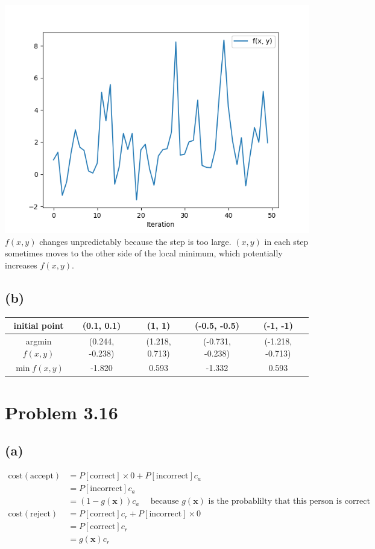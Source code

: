 \documentclass{article}
\begin{document}
		\includegraphics[scale=0.7]{2a2.png}\\
		$f(x, y)$ changes unpredictably because the step is too large. $(x, y)$ in each step sometimes moves to the other side of the local minimum, which potentially increases $f(x, y)$.
		
	\subsection*{(b)}
		\begin{tabular}{c|cccc}
			initial point & (0.1, 0.1) & (1, 1) & (-0.5, -0.5) & (-1, -1)\\
			\hline
			argmin $f(x, y)$ & (0.244, -0.238) & (1.218, 0.713) & (-0.731, -0.238) & (-1.218, -0.713)\\
			\hline
			$\min f(x, y)$ & -1.820 & 0.593 & -1.332 & 0.593
		\end{tabular}
		
	\section*{Problem 3.16}
	\subsection*{(a)}
		\begin{align*}
			\text{cost}(\text{accept}) &= P[\text{correct}]\times 0 + P[\text{incorrect}]c_a\\
			&= P[\text{incorrect}]c_a\\
			&= (1-g(\mathbf x))c_a\ \ \ \ \ \ \text{because } g(\mathbf x) \text{ is the probablilty that this person is correct}\\
			\text{cost}(\text{reject}) &= P[\text{correct}]c_r + P[\text{incorrect}] \times 0\\
			&= P[\text{correct}]c_r\\
			&= g(\mathbf x)c_r
		\end{align*}
\end{document}
